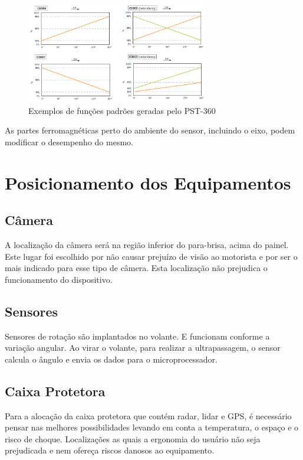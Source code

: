 
\begin{figure}[h]
  \centering
  \includegraphics[width=300px, scale=1]{figuras/pst_saida_padrao}
  \caption{ Exemplos de funções padrões geradas pelo PST-360 \cite{sensor_rotacao}}
\label{fig:pst_saida_padrao}
\end{figure}

As partes ferromagnéticas perto do ambiente do sensor, incluindo o eixo,
podem modificar o desempenho do mesmo.



\section{Posicionamento dos Equipamentos}
\subsection{Câmera}
A localização da câmera será na região inferior do para-brisa, acima do painel.
Este lugar foi escolhido por não causar prejuízo de visão ao motorista e por ser o mais
indicado para esse tipo de câmera. Esta localização não prejudica o funcionamento do
dispositivo.

\subsection{Sensores}
Sensores de rotação são implantados no volante. E funcionam conforme a
variação angular. Ao virar o volante, para realizar a ultrapassagem, o sensor calcula o
ângulo e envia os dados para o microprocessador.

\subsection{Caixa Protetora}
Para a alocação da caixa protetora que contém radar, lidar e GPS, é necessário
pensar nas melhores possibilidades levando em conta a temperatura, o espaço e o risco
de choque. Localizações as quais a ergonomia do usuário não seja prejudicada e nem
ofereça riscos danosos ao equipamento.

